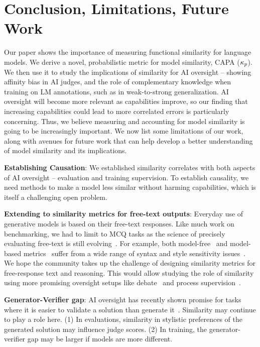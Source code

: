 \section{Conclusion, Limitations, Future Work}

Our paper shows the importance of measuring functional similarity for language models. We derive a novel, probabilistic metric for model similarity, CAPA ($\kappa_{p}$). We then use it to study the implications of similarity for AI oversight -- showing affinity bias in AI judges, and the role of complementary knowledge when training on LM annotations, such as in weak-to-strong generalization. AI oversight will become more relevant as capabilities improve, so our finding that increasing capabilities could lead to more correlated errors is particularly concerning. Thus, we believe measuring and accounting for model similarity is going to be increasingly important. We now list some limitations of our work, along with avenues for future work that can help develop a better understanding of model similarity and its implications.

\textbf{Establishing Causation}: We established similarity correlates with both aspects of AI oversight -- evaluation and training supervision. To establish causality, we need methods to make a model less similar without harming capabilities, which is itself a challenging open problem.

\textbf{Extending to similarity metrics for free-text outputs}: Everyday use of generative models is based on their free-text responses. Like much work on benchmarking, we had to limit to MCQ tasks as the science of precisely evaluating free-text is still evolving~\citep{biderman2024lessonstrenchesreproducibleevaluation}. For example, both model-free~\citep{papineni-etal-2002-bleu} and model-based metrics~\citep{pillutla2021mauve} suffer from a wide range of syntax and style sensitivity issues~\citep{kocmi-etal-2021-ship, he-etal-2023-blind}. We hope the community takes up the challenge of designing similarity metrics for free-response text and reasoning. This would allow studying the role of similarity using more promising oversight setups like debate~\citep{kenton2024scalableoversightweakllms} and process supervision~\citep{lightman2023let}.
    
\textbf{Generator-Verifier gap}: AI oversight has recently shown promise for tasks where it is easier to validate a solution than generate it~\citep{song2024mindgapexaminingselfimprovement}. Similarity may continue to play a role here. (1) In evaluations, similarity in stylistic preferences of the generated solution may influence judge scores. (2) In training, the generator-verifier gap may be larger if models are more different.
    
